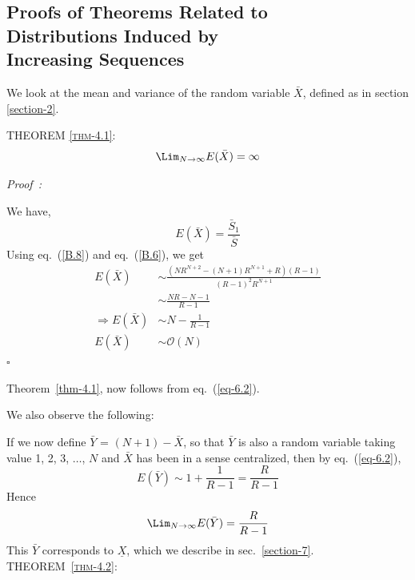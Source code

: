 \begin{multicols}{2}
\vspace{-.3cm}

\section{Proofs of Theorems Related to\\ Distributions Induced by\\ Increasing Sequences}\label{section-6}

\vspace{-.2cm}

We look at the mean and variance of the random variable $\bar{X}$, defined as in section \ref{section-2}.

\noindent
 \textsc{THEOREM {\ref{thm-4.1}}:}
\begin{equation*}
\displaystyle{\Lim_{N \rightarrow \infty}} E(\bar{X}) = \infty  
 \end{equation*}

\noindent
{\it Proof~:}

We have,
\begin{equation}
E(\bar{X}) = \frac{\bar{S}_1}{\bar{S}}\label{eq-6.1}
\end{equation}
Using eq.~(\ref{B.8}) and eq.~(\ref{B.6}), we get
\begin{align}
E(\bar{X})&\sim \frac{(NR^{N+2}-(N+1)R^{N+1}+R)(R-1)}{(R-1)^2 R^{N+1}}\nonumber\\
&\sim \frac{NR-N-1}{R-1}\nonumber\\
\Rightarrow E(\bar{X}) &\sim N - \frac{1}{R-1}\label{eq-6.2}\\
\nonumber E(\bar{X}) &\sim \mathcal{O}(N)
\end{align}\hfill{$\square$\\}


\vspace{-.7cm}

Theorem~\ref{thm-4.1}, now follows from eq.~(\ref{eq-6.2}).

We also observe the following: 

 If we now define $\bar Y$ = $(N+1)- \bar{X}$, so that $\bar{Y}$ is also a random variable taking value 1, 2, 3, $\ldots$, $N$ and $\bar{X}$ has been in a sense centralized, then by eq.~(\ref{eq-6.2}),
 \begin{equation*}
 E(\bar{Y}) \sim 1 + \frac{1}{R-1} = \frac{R}{R-1}
 \end{equation*}
Hence 
\begin{equation*}
\displaystyle{\Lim_{N \rightarrow \infty}} E(\bar{Y}) = \frac{R}{R-1} 
\end{equation*}
This $\bar{Y}$ corresponds to $\underline{X}$, which we describe in sec.~\ref{section-7}.\\
\textsc{THEOREM~{\ref{thm-4.2}}:}


\end{multicols}
